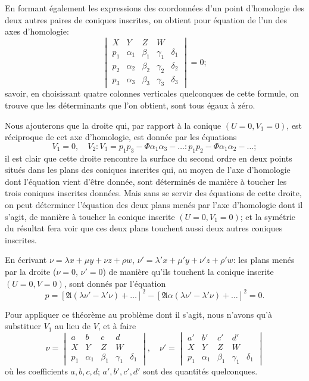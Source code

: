 \documentclass[12pt,a4paper]{article}
\theoremstyle{definition}
\begin{document}
En formant \'{e}galement les expressions des coordonn\'{e}es d'un point d'homologie des deux autres paires de coniques inscrites, on obtient pour \'{e}quation de l'un des axes d'homologie:
\[
\begin{vmatrix}
X & Y & Z & W \\
p_1 & \alpha_1 & \beta_1 & \gamma_1 & \delta_1 \\
p_2 & \alpha_2 & \beta_2 & \gamma_2 & \delta_2 \\
p_3 & \alpha_3 & \beta_3 & \gamma_3 & \delta_3
\end{vmatrix} = 0;
\]
savoir, en choisissant quatre colonnes verticales quelconques de cette formule, on trouve que les d\'{e}terminants que l'on obtient, sont tous \'{e}gaux \`{a} z\'{e}ro.

Nous ajouterons que la droite qui, par rapport \`{a} la conique $(U = 0, V_1 = 0)$, est r\'{e}ciproque de cet axe d'homologie, est donn\'{e}e par les \'{e}quations
\[
V_1 = 0, \quad V_2 : V_3 = p_1 p_3 - \Phi \alpha_1 \alpha_3 - \ldots : p_1 p_2 - \Phi \alpha_1 \alpha_2 - \ldots;
\]
il est clair que cette droite rencontre la surface du second ordre en deux points situ\'{e}s dans les plans des coniques inscrites qui, au moyen de l'axe d'homologie dont l'\'{e}quation vient d'\^{e}tre donn\'{e}e, sont d\'{e}termin\'{e}s de mani\`{e}re \`{a} toucher les trois coniques inscrites donn\'{e}es. Mais sans se servir des \'{e}quations de cette droite, on peut d\'{e}terminer l'\'{e}quation des deux plans men\'{e}s par l'axe d'homologie dont il s'agit, de mani\`{e}re \`{a} toucher la conique inscrite $(U = 0, V_1 = 0)$; et la sym\'{e}trie du r\'{e}sultat fera voir que ces deux plans touchent aussi deux autres coniques inscrites.

En \'{e}crivant $\nu = \lambda x + \mu y + \nu z + \rho w$, $\nu' = \lambda' x + \mu' y + \nu' z + \rho' w$: les plans men\'{e}s par la droite ($\nu = 0$, $\nu' = 0$) de mani\`{e}re qu'ils touchent la conique inscrite $(U = 0, V = 0)$, sont donn\'{e}s par l'\'{e}quation
\[
p = [\mathfrak{A}(\lambda \nu' - \lambda' \nu) + \ldots]^2 - [\mathfrak{A}\alpha(\lambda \nu' - \lambda' \nu) + \ldots]^2 = 0.
\]

Pour appliquer ce th\'{e}or\`{e}me au probl\`{e}me dont il s'agit, nous n'avons qu'\`{a} substituer $V_1$ au lieu de $V$, et \`{a} faire
\[
\nu =
\begin{vmatrix}
a & b & c & d \\
X & Y & Z & W \\
p_1 & \alpha_1 & \beta_1 & \gamma_1 & \delta_1
\end{vmatrix},
\quad
\nu' =
\begin{vmatrix}
a' & b' & c' & d' \\
X & Y & Z & W \\
p_1 & \alpha_1 & \beta_1 & \gamma_1 & \delta_1
\end{vmatrix}
\]
o\`{u} les coefficients $a, b, c, d$; $a', b', c', d'$ sont des quantit\'{e}s quelconques.
\end{document}
